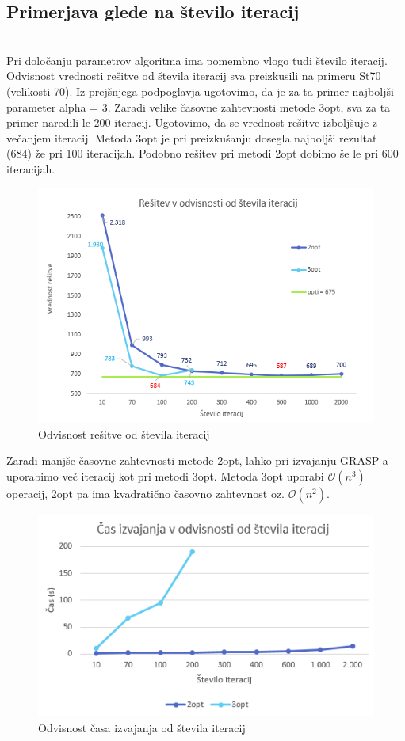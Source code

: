 \documentclass[12pt,a4paper]{amsart}
\theoremstyle{definition} %
\theoremstyle{plain} %
\begin{document}
\subsection{Primerjava glede na število iteracij} ~\\

Pri določanju parametrov algoritma ima pomembno vlogo tudi število iteracij. Odvisnost vrednosti rešitve od števila iteracij sva preizkusili na primeru St70 (velikosti 70). Iz prejšnjega podpoglavja ugotovimo, da je za ta primer najboljši parameter alpha = 3. Zaradi velike časovne zahtevnosti metode 3opt, sva za ta primer naredili le 200 iteracij. Ugotovimo, da se vrednost rešitve izboljšuje z večanjem iteracij. Metoda 3opt je pri preizkušanju dosegla najboljši rezultat (684) že pri 100 iteracijah. Podobno rešitev pri metodi 2opt dobimo še le pri 600 iteracijah. 

\begin{figure}[H]
\caption{Odvisnost rešitve od števila iteracij}
\centering
\includegraphics[scale =0.8]{resitev_iteracije}
\end{figure}

Zaradi manjše časovne zahtevnosti metode 2opt, lahko pri izvajanju GRASP-a uporabimo več iteracij kot pri metodi 3opt. Metoda 3opt uporabi $\mathcal{O}(n^3)$ operacij, 2opt pa ima kvadratično časovno zahtevnost oz. $\mathcal{O}(n^2)$.

\begin{figure}[H]
\caption{Odvisnost časa izvajanja od števila iteracij}
\centering
\includegraphics[scale =0.8]{cas_izvajanja}
\end{figure}
\end{document}
